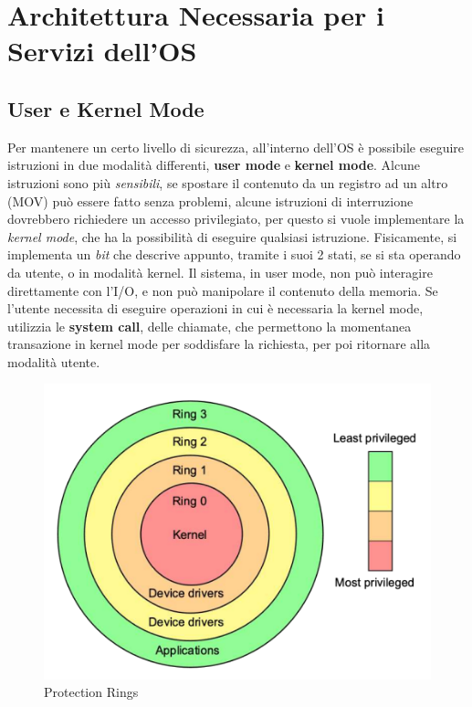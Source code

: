 \documentclass[12pt, letterpaper]{article}
\begin{document}
\section{Architettura Necessaria per i Servizi dell'OS}\subsection{User e Kernel Mode}\label{user kernel}
Per mantenere un certo livello di sicurezza, all'interno dell'OS è possibile eseguire istruzioni in due 
modalità differenti, \textbf{user mode} e \textbf{kernel mode}. Alcune istruzioni sono più
\textit{sensibili}, se spostare il contenuto da un registro ad un altro (MOV) può essere fatto senza 
problemi, alcune istruzioni di interruzione dovrebbero richiedere un accesso privilegiato, per questo 
si vuole implementare la \textit{kernel mode}, che ha la possibilità di eseguire qualsiasi istruzione.
Fisicamente, si implementa un \textit{bit} che descrive appunto, tramite i suoi 2 stati, se si sta 
operando da utente, o in modalità kernel. Il sistema, in user mode, non può interagire direttamente 
con l'I/O, e non può manipolare il contenuto della memoria. Se l'utente necessita di eseguire operazioni 
in cui è necessaria la kernel mode, utilizzia le \textbf{system call}, delle chiamate, che permettono 
la momentanea transazione in kernel mode per soddisfare la richiesta, per poi ritornare alla modalità 
utente.
\begin{figure}
    \includegraphics[width=1\linewidth]{images/protectionRings.png} 
    \caption{Protection Rings}
    \label{fig:wrapfig}
    \end{figure}
\end{document}
